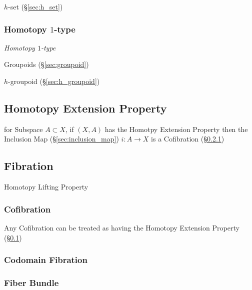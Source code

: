 $h$-set (\S\ref{sec:h_set})



\subsubsection{Homotopy $1$-type}\label{sec:homotopy_1type}

\emph{Homotopy $1$-type}

Groupoids (\S\ref{sec:groupoid})

$h$-groupoid (\S\ref{sec:h_groupoid})



\subsection{Homotopy Extension Property}\label{sec:homotopy_extension}

for Subspace $A \subset X$, if $(X,A)$ has the Homotpy Extension
Property then the Inclusion Map (\S\ref{sec:inclusion_map}) $i : A
\rightarrow X$ is a Cofibration (\S\ref{sec:cofibration})



\subsection{Fibration}\label{sec:fibration}

Homotopy Lifting Property



\subsubsection{Cofibration}\label{sec:cofibration}

Any Cofibration can be treated as having the Homotopy Extension
Property (\S\ref{sec:homotopy_extension})



\subsubsection{Codomain Fibration}\label{sec:codomain_fibration}

\subsubsection{Fiber Bundle}\label{sec:fiber_bundle}

